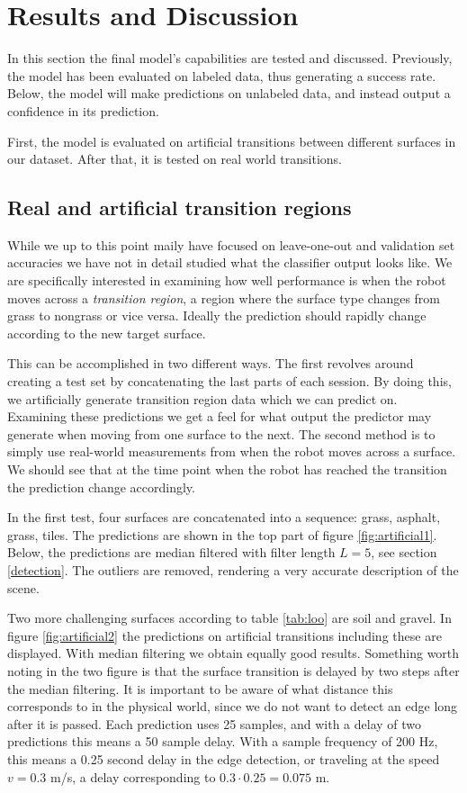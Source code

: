 \chapter{Results and Discussion}
In this section the final model's capabilities are tested and discussed. Previously, the model has been evaluated on labeled data, thus generating a success rate. Below, the model will make predictions on unlabeled data, and instead output a confidence in its prediction.

First, the model is evaluated on artificial transitions between different surfaces in our dataset. After that, it is tested on real world transitions.

\section{Real and artificial transition regions}

While we up to this point maily have focused on leave-one-out and validation set accuracies we have not in detail studied what the classifier output looks like. We are specifically interested in examining how well performance is when the robot moves across a \emph{transition region}, a region where the surface type changes from grass to nongrass or vice versa. Ideally the prediction should rapidly change according to the new target surface. 

This can be accomplished in two different ways. The first revolves around creating a test set by concatenating the last parts of each session. By doing this, we artificially generate transition region data which we can predict on. Examining these predictions we get a feel for what output the predictor may generate when moving from one surface to the next. The second method is to simply use real-world measurements from when the robot moves across a surface. We should see that at the time point when the robot has reached the transition the prediction change accordingly. 

In the first test, four surfaces are concatenated into a sequence: grass, asphalt, grass, tiles. The predictions are shown in the top part of figure \ref{fig:artificial1}. Below, the predictions are median filtered with filter length $L=5$, see section \ref{detection}. The outliers are removed, rendering a very accurate description of the scene. 

Two more challenging surfaces according to table \ref{tab:loo} are soil and gravel. In figure \ref{fig:artificial2} the predictions on artificial transitions including these are displayed. With median filtering we obtain equally good results. Something worth noting in the two figure is that the surface transition is delayed by two steps after the median filtering. It is important to be aware of what distance this corresponds to in the physical world, since we do not want to detect an edge long after it is passed. Each prediction uses 25 samples, and with a delay of two predictions this means a 50 sample delay. With a sample frequency of 200 Hz, this means a 0.25 second delay in the edge detection, or traveling at the speed $v=0.3$ m/s, a delay corresponding to $0.3\cdot0.25=0.075$ m.

